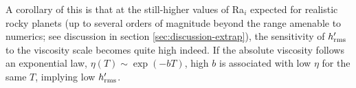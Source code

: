 \documentclass[trackchanges]{aastex63}
\newcommand{\todo}[1]{\textit{\textcolor{violet}{{#1}}}}
\begin{document}
A corollary of this is that at the still-higher values of Ra$_i$ expected for realistic rocky planets (up to several orders of magnitude beyond the range amenable to numerics; see discussion in section \ref{sec:discussion-extrap}), the sensitivity of $h_{\rm rms}^\prime$ to the viscosity scale becomes quite high indeed. If the absolute viscosity follows an exponential law, $\eta(T) \sim \exp(-b T)$, high $b$ is associated with low $\eta$ for the same $T$, implying low $h_{\rm rms}^\prime$. 





\end{document}
